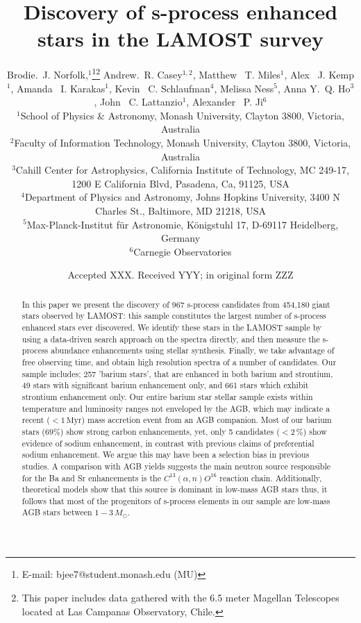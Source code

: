 \documentclass[a4paper,fleqn,usenatbib]{mnras}
\title[S-process stars in LAMOST]{Discovery of s-process enhanced stars in the LAMOST survey}
\author[Brodie.~J. Norfolk et al.]{Brodie.~J. Norfolk,$^{1}$\thanks{E-mail: bjee7@student.monash.edu (MU)}\thanks{This paper includes data gathered with the 6.5 meter Magellan Telescopes located at Las Campanas Observatory, Chile.}
Andrew.~R. Casey$^{1,2}$,
Matthew ~T. Miles$^{1}$,
Alex ~J. Kemp$^{1}$, \newauthor
Amanda ~I. Karakas$^{1}$,
Kevin ~C. Schlaufman$^{4}$,
Melissa Ness$^{5}$,
Anna Y.~Q. Ho$^{3}$, \newauthor
John ~C. Lattanzio$^{1}$, 
Alexander ~P. Ji$^{6}$
\\
$^{1}$School of Physics \& Astronomy, Monash University, Clayton 3800, Victoria, Australia\\
$^{2}$Faculty of Information Technology, Monash University, Clayton 3800, Victoria, Australia\\
$^{3}$Cahill Center for Astrophysics, California Institute of Technology, MC 249-17, 1200 E California Blvd, Pasadena, Ca, 91125, USA\\
$^{4}$Department of Physics and Astronomy, Johns Hopkins University, 3400 N Charles St., Baltimore, MD 21218, USA
\\
$^{5}$Max-Planck-Institut f\"ur Astronomie, K\"onigstuhl 17, D-69117 Heidelberg, Germany
\\
$^{6}$Carnegie Observatories
}
\date{Accepted XXX. Received YYY; in original form ZZZ}
\begin{document}
\label{firstpage}
\pagerange{\pageref{firstpage}--\pageref{lastpage}}
\maketitle

\begin{abstract}

In this paper we present the discovery of 967 s-process candidates from 454,180 giant stars observed by LAMOST: this sample constitutes the largest number of s-process enhanced stars ever discovered. We identify these stars in the LAMOST sample by using a data-driven search approach on the spectra directly, and then measure the s-process abundance enhancements using stellar synthesis. Finally, we take advantage of free observing time, and obtain high resolution spectra of a number of candidates. Our sample includes; 257 'barium stars', that are enhanced in both barium and strontium, 49 stars with significant barium enhancement only, and 661 stars which exhibit strontium enhancement only. Our entire barium star stellar sample exists within temperature and luminosity ranges not enveloped by the AGB, which may indicate a recent ($<1\,\textrm{Myr}$) mass accretion event from an AGB companion. Most of our barium stars ($69\%$) show strong carbon enhancements, yet, only 5 candidates ($<2$\,\%) show evidence of sodium enhancement, in contrast with previous claims of preferential sodium enhancement. We argue this may have been a selection bias in previous studies. A comparison with AGB yields suggests the main neutron source responsible for the Ba and Sr enhancements is the $C^{13}(\alpha,n)O^{16}$ reaction chain. Additionally, theoretical models show that this source is dominant in low-mass AGB stars thus, it follows that most of the progenitors of s-process elements in our sample are low-mass AGB stars between $1 - 3\,M_{\odot}$. 



\end{abstract}
\end{document}
